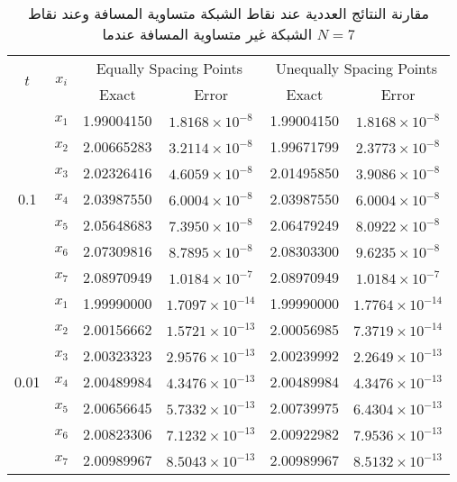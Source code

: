 \begin{example}
	
	\begin{table}[H]
		\renewcommand{\arraystretch}{1.5}
		\centering
		\begin{english}
\begin{tabular}{|c|c|c|c|c|c|}
			\hline
			\multirow{2}{*}{\( t \)} & \multirow{2}{*}{\( x_i \)} & \multicolumn{2}{c|}{Equally Spacing Points} & \multicolumn{2}{c|}{Unequally Spacing Points} \\
			\cline{3-6}
			& & Exact & Error & Exact & Error \\
			\hline
			\multirow{7}{*}{0.1} & \( x_1 \) & 1.99004150 & \( 1.8168 \times 10^{-8} \) & 1.99004150 & \( 1.8168 \times 10^{-8} \) \\
			& \( x_2 \) & 2.00665283 & \( 3.2114 \times 10^{-8} \) & 1.99671799 & \( 2.3773 \times 10^{-8} \) \\
			& \( x_3 \) & 2.02326416 & \( 4.6059 \times 10^{-8} \) & 2.01495850 & \( 3.9086 \times 10^{-8} \) \\
			& \( x_4 \) & 2.03987550 & \( 6.0004 \times 10^{-8} \) & 2.03987550 & \( 6.0004 \times 10^{-8} \) \\
			& \( x_5 \) & 2.05648683 & \( 7.3950 \times 10^{-8} \) & 2.06479249 & \( 8.0922 \times 10^{-8} \) \\
			& \( x_6 \) & 2.07309816 & \( 8.7895 \times 10^{-8} \) & 2.08303300 & \( 9.6235 \times 10^{-8} \) \\
			& \( x_7 \) & 2.08970949 & \( 1.0184 \times 10^{-7} \) & 2.08970949 & \( 1.0184 \times 10^{-7} \) \\
			\hline
			\multirow{7}{*}{0.01} & \( x_1 \) & 1.99990000 & \( 1.7097 \times 10^{-14} \) & 1.99990000 & \( 1.7764 \times 10^{-14} \) \\
			& \( x_2 \) & 2.00156662 & \( 1.5721 \times 10^{-13} \) & 2.00056985 & \( 7.3719 \times 10^{-14} \) \\
			& \( x_3 \) & 2.00323323 & \( 2.9576 \times 10^{-13} \) & 2.00239992 & \( 2.2649 \times 10^{-13} \) \\
			& \( x_4 \) & 2.00489984 & \( 4.3476 \times 10^{-13} \) & 2.00489984 & \( 4.3476 \times 10^{-13} \) \\
			& \( x_5 \) & 2.00656645 & \( 5.7332 \times 10^{-13} \) & 2.00739975 & \( 6.4304 \times 10^{-13} \) \\
			& \( x_6 \) & 2.00823306 & \( 7.1232 \times 10^{-13} \) & 2.00922982 & \( 7.9536 \times 10^{-13} \) \\
			& \( x_7 \) & 2.00989967 & \( 8.5043 \times 10^{-13} \) & 2.00989967 & \( 8.5132 \times 10^{-13} \) \\
			\hline
		\end{tabular}
\end{english}
	\caption{\centering مقارنة النتائج العددية عند نقاط الشبكة متساوية المسافة وعند نقاط الشبكة غير متساوية المسافة عندما $N=7$}
\label{tab:secondN7}
\end{table}


\end{example}
